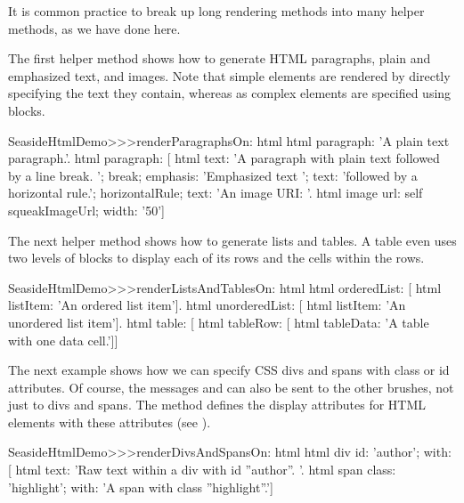 \documentclass[a4paper,10pt,twoside]{book}
\begin{document}
It is common practice to break up long rendering methods into many helper methods, as we have done here.


The first helper method shows how to generate HTML paragraphs, plain and emphasized text, and images.
Note that simple elements are rendered by directly specifying the text they contain, whereas as complex elements are specified using blocks.

\begin{code}{}
SeasideHtmlDemo>>>renderParagraphsOn: html 
	html paragraph: 'A plain text paragraph.'.
	html paragraph: [
		html
			text: 'A paragraph with plain text followed by a line break. ';
			break;
			emphasis: 'Emphasized text ';
			text: 'followed by a horizontal rule.';
			horizontalRule;
			text: 'An image URI: '.
		html image
			url: self squeakImageUrl;
			width: '50']
\end{code}

The next helper method shows how to generate lists and tables.
A table even uses two levels of blocks to display each of its rows and the cells within the rows.

\begin{code}{}
SeasideHtmlDemo>>>renderListsAndTablesOn: html 
	html orderedList: [
		html listItem: 'An ordered list item'].
	html unorderedList: [
		html listItem: 'An unordered list item'].
	html table: [
		html tableRow: [
			html tableData: 'A table with one data cell.']]
\end{code}

The next example shows how we can specify CSS divs and spans with class or id attributes.
Of course, the messages  and  can also be sent to the other brushes, not just to divs and spans.
The method  defines the display attributes for HTML elements with these attributes (see ).

\begin{code}{}
SeasideHtmlDemo>>>renderDivsAndSpansOn: html 
	html div
		id: 'author';
		with: [
			html text: 'Raw text within a div with id ''author''. '.
			html span
				class: 'highlight';
				with: 'A span with class ''highlight''.']
\end{code}
\end{document}
